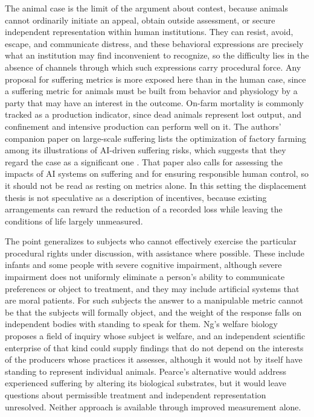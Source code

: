\documentclass[11pt]{article}
\begin{document}
The animal case is the limit of the argument about contest, because animals cannot ordinarily initiate an appeal, obtain outside assessment, or secure independent representation within human institutions. They can resist, avoid, escape, and communicate distress, and these behavioral expressions are precisely what an institution may find inconvenient to recognize, so the difficulty lies in the absence of channels through which such expressions carry procedural force. Any proposal for suffering metrics is more exposed here than in the human case, since a suffering metric for animals must be built from behavior and physiology by a party that may have an interest in the outcome. On-farm mortality is commonly tracked as a production indicator, since dead animals represent lost output, and confinement and intensive production can perform well on it. The authors' companion paper on large-scale suffering lists the optimization of factory farming among its illustrations of AI-driven suffering risks, which suggests that they regard the case as a significant one \citep{veldran2026}. That paper also calls for assessing the impacts of AI systems on suffering and for ensuring responsible human control, so it should not be read as resting on metrics alone. In this setting the displacement thesis is not speculative as a description of incentives, because existing arrangements can reward the reduction of a recorded loss while leaving the conditions of life largely unmeasured.

The point generalizes to subjects who cannot effectively exercise the particular procedural rights under discussion, with assistance where possible. These include infants and some people with severe cognitive impairment, although severe impairment does not uniformly eliminate a person's ability to communicate preferences or object to treatment, and they may include artificial systems that are moral patients. For such subjects the answer to a manipulable metric cannot be that the subjects will formally object, and the weight of the response falls on independent bodies with standing to speak for them. Ng's welfare biology proposes a field of inquiry whose subject is welfare, and an independent scientific enterprise of that kind could supply findings that do not depend on the interests of the producers whose practices it assesses, although it would not by itself have standing to represent individual animals. Pearce's alternative would address experienced suffering by altering its biological substrates, but it would leave questions about permissible treatment and independent representation unresolved. Neither approach is available through improved measurement alone.
\end{document}
